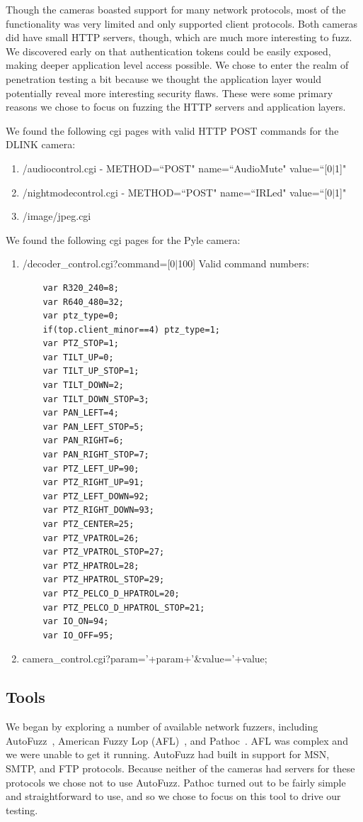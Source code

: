 \documentclass[letterpaper,twocolumn,10pt]{article}
\begin{document}
Though the cameras boasted support for many network protocols, most of the functionality was very limited and only supported client protocols. Both cameras did have small HTTP servers, though, which are much more interesting to fuzz. We discovered early on that authentication tokens could be easily exposed, making deeper application level access possible. We chose to enter the realm of penetration testing a bit because we thought the application layer would potentially reveal more interesting security flaws.  These were some primary reasons we chose to focus on fuzzing the HTTP servers and application layers. 

We found the following cgi pages with valid HTTP POST commands for the DLINK camera: 


\begin{enumerate}
	\item /audiocontrol.cgi - METHOD=``POST" name=``AudioMute" value=``[0$\mid$1]"
	\item /nightmodecontrol.cgi - METHOD=``POST" name=``IRLed" value=``[0$\mid$1]"
	\item /image/jpeg.cgi
\end{enumerate}

We found the following cgi pages for the Pyle camera:
\begin{enumerate}
	\item /decoder\_control.cgi?command=[0$\mid$100]
	\newline Valid command numbers:
	\begin{verbatim}
	var R320_240=8;
	var R640_480=32;
	var ptz_type=0;	
	if(top.client_minor==4) ptz_type=1;
	var PTZ_STOP=1;
	var TILT_UP=0;
	var TILT_UP_STOP=1;
	var TILT_DOWN=2;
	var TILT_DOWN_STOP=3;
	var PAN_LEFT=4;
	var PAN_LEFT_STOP=5;
	var PAN_RIGHT=6;
	var PAN_RIGHT_STOP=7;
	var PTZ_LEFT_UP=90;
	var PTZ_RIGHT_UP=91;
	var PTZ_LEFT_DOWN=92;
	var PTZ_RIGHT_DOWN=93;
	var PTZ_CENTER=25;
	var PTZ_VPATROL=26;
	var PTZ_VPATROL_STOP=27;
	var PTZ_HPATROL=28;
	var PTZ_HPATROL_STOP=29;
	var PTZ_PELCO_D_HPATROL=20;
	var PTZ_PELCO_D_HPATROL_STOP=21;
	var IO_ON=94;
	var IO_OFF=95;
	\end{verbatim}
	\item camera\_control.cgi?param='+param+'\&value='+value; 
\end{enumerate}


\subsection{Tools}
We began by exploring a number of available network fuzzers, including AutoFuzz~\cite{autofuzz}, American Fuzzy Lop (AFL)~\cite{afl}, and Pathoc~\cite{pathod}. AFL was complex and we were unable to get it running. AutoFuzz had built in support for MSN, SMTP, and FTP protocols. Because neither of the cameras had servers for these protocols we chose not to use AutoFuzz. Pathoc turned out to be fairly simple and straightforward to use, and so we chose to focus on this tool to drive our testing. 
\end{document}
